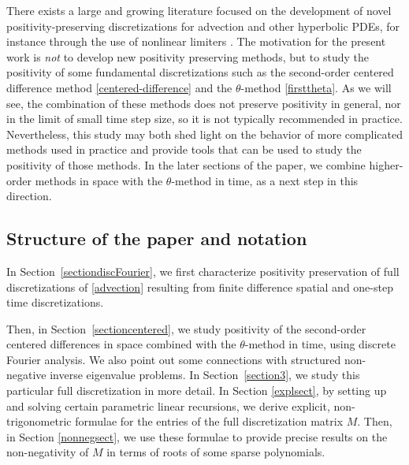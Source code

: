 \documentclass[smallextended,numbook,runningheads]{svjour3}     %
\begin{document}
There exists a large and growing literature focused on the development of novel
positivity-preserving discretizations for advection and other hyperbolic PDEs,
for instance through the use of nonlinear limiters 
\cite{hundsdorfer1995positive,liu1996,horvath1998,Higueras2010}.
The motivation for the present work is \emph{not} to develop new positivity preserving
methods, but to study the positivity of some fundamental discretizations
such as the second-order centered difference method \eqref{centered-difference} and the
$\theta$-method \eqref{firsttheta}.  As we will see, the combination of
these methods does not preserve positivity in general, nor in the limit
of small time step size, so it is not typically recommended in practice.
Nevertheless, this study may both shed light on the
behavior of more complicated methods used in practice and provide tools
that can be used to study the positivity of those methods.
In the later sections of the paper, we combine higher-order methods in space with the $\theta$-method in time, as a next step in this direction.


\subsection{Structure of the paper and notation}
In Section~\ref{sectiondiscFourier}, we first characterize
positivity preservation of full discretizations of \eqref{advection} resulting from 
finite difference spatial and one-step time discretizations. 

Then, in Section~\ref{sectioncentered}, we study positivity of the second-order centered differences in space
combined with the $\theta$-method in
time, using discrete Fourier
analysis. We also point out some connections with structured non-negative inverse eigenvalue problems. In Section~\ref{section3}, we study this particular full discretization in more detail.
In Section \ref{explsect}, by setting up and solving certain parametric linear recursions, we derive explicit, non-trigonometric formulae for the entries of the full discretization matrix $M$. Then, in Section \ref{nonnegsect}, we use these formulae to provide precise results on the non-negativity of $M$ in terms of roots of some  sparse polynomials.
\end{document}
